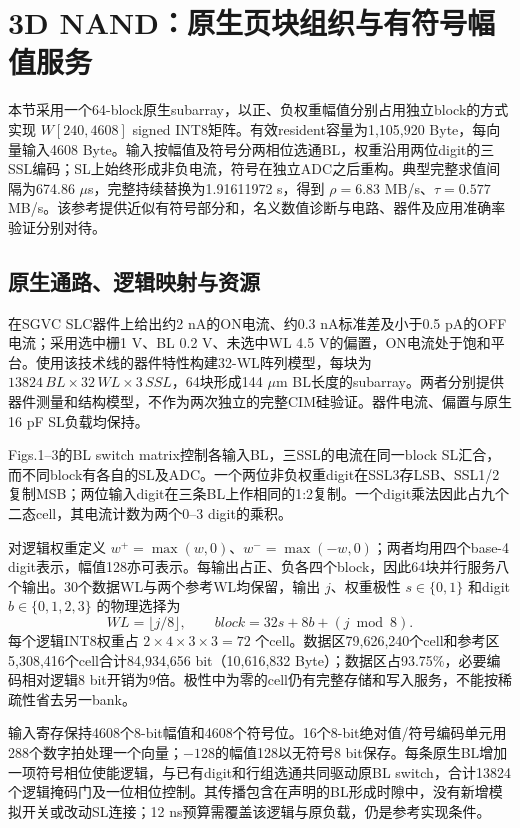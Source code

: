 \section{3D NAND：原生页块组织与有符号幅值服务}

本节采用一个64-block原生subarray，以正、负权重幅值分别占用独立block的方式实现 $W[240,4608]$ signed INT8矩阵。有效resident容量为1,105,920 Byte，每向量输入4608 Byte。输入按幅值及符号分两相位选通BL，权重沿用两位digit的三SSL编码；SL上始终形成非负电流，符号在独立ADC之后重构。典型完整求值间隔为674.86 $\mu$s，完整持续替换为1.91611972 s，得到 $\rho=6.83$ MB/s、$\tau=0.577$ MB/s。该参考提供近似有符号部分和，名义数值诊断与电路、器件及应用准确率验证分别对待。

\subsection{原生通路、逻辑映射与资源}

在SGVC SLC器件上给出约2 nA的ON电流、约0.3 nA标准差及小于0.5 pA的OFF电流；采用选中栅1 V、BL 0.2 V、未选中WL 4.5 V的偏置，ON电流处于饱和平台。使用该技术线的器件特性构建32-WL阵列模型，每块为 $13824\,BL\times32\,WL\times3\,SSL$，64块形成144 $\mu$m BL长度的subarray。两者分别提供器件测量和结构模型，不作为两次独立的完整CIM硅验证。器件电流、偏置与原生16 pF SL负载均保持。
\cite{nand04,nand05}

 Figs.1--3的BL switch matrix控制各输入BL，三SSL的电流在同一block SL汇合，而不同block有各自的SL及ADC。一个两位非负权重digit在SSL3存LSB、SSL1/2复制MSB；两位输入digit在三条BL上作相同的1:2复制。一个digit乘法因此占九个二态cell，其电流计数为两个0--3 digit的乘积。

对逻辑权重定义 $w^+=\max(w,0)$、$w^-=\max(-w,0)$；两者均用四个base-4 digit表示，幅值128亦可表示。每输出占正、负各四个block，因此64块并行服务八个输出。30个数据WL与两个参考WL均保留，输出 $j$、权重极性 $s\in\{0,1\}$ 和digit $b\in\{0,1,2,3\}$ 的物理选择为
\[
 WL=\lfloor j/8\rfloor,\qquad
 block=32s+8b+(j\bmod8).
\]
每个逻辑INT8权重占 $2\times4\times3\times3=72$ 个cell。数据区79,626,240个cell和参考区5,308,416个cell合计84,934,656 bit（10,616,832 Byte）；数据区占93.75\%，必要编码相对逻辑8 bit开销为9倍。极性中为零的cell仍有完整存储和写入服务，不能按稀疏性省去另一bank。

输入寄存保持4608个8-bit幅值和4608个符号位。16个8-bit绝对值/符号编码单元用288个数字拍处理一个向量；$-128$的幅值128以无符号8 bit保存。每条原生BL增加一项符号相位使能逻辑，与已有digit和行组选通共同驱动原BL switch，合计13824个逻辑掩码门及一位相位控制。其传播包含在声明的BL形成时隙中，没有新增模拟开关或改动SL连接；12 ns预算需覆盖该逻辑与原负载，仍是参考实现条件。

